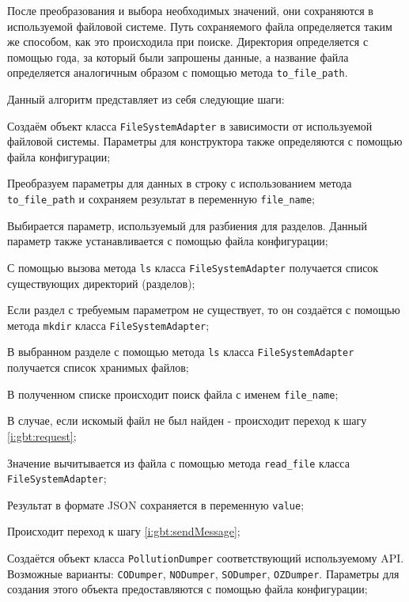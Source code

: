 После преобразования и выбора необходимых значений, они сохраняются в используемой файловой системе.
Путь сохраняемого файла определяется таким же способом, как это происходила при поиске.
Директория определяется с помощью года, за который были запрошены данные, а название файла определяется аналогичным образом с помощью метода \texttt{to\_file\_path}.

Данный алгоритм представляет из себя следующие шаги:
\begin{enumerate_step}
    \item Создаём объект класса \texttt{FileSystemAdapter} в зависимости от используемой файловой системы.
     Параметры для конструктора также определяются с помощью файла конфигурации;
    \item Преобразуем параметры для данных в строку с использованием метода \texttt{to\_file\_path} и сохраняем результат в переменную \texttt{file\_name};
    \item Выбирается параметр, используемый для разбиения для разделов. 
    Данный параметр также устанавливается с помощью файла конфигурации;
    \item С помощью вызова метода \texttt{ls} класса \texttt{FileSystemAdapter} получается список существующих директорий (разделов);
    \item Если раздел с требуемым параметром не существует, то он создаётся с помощью метода \texttt{mkdir} класса \texttt{FileSystemAdapter};
    \item В выбранном разделе с помощью метода \texttt{ls} класса \texttt{FileSystemAdapter} получается список хранимых файлов;
    \item В полученном списке происходит поиск файла с именем \texttt{file\_name};
    \item В случае, если искомый файл не был найден - происходит переход к шагу \ref{i:gbt:request};
    \item Значение вычитывается из файла с помощью метода \texttt{read\_file} класса \texttt{FileSystemAdapter};
    \item Результат в формате JSON сохраняется в переменную \texttt{value};
    \item Происходит переход к шагу \ref{i:gbt:sendMessage};
    \item \label{i:gbt:request} Создаётся объект класса \texttt{PollutionDumper} соответствующий используемому API. 
    Возможные варианты: \texttt{CODumper}, \texttt{NODumper}, \texttt{SODumper}, \texttt{OZDumper}.
    Параметры для создания этого объекта предоставляются с помощью файла конфигурации;

\end{enumerate_step}

